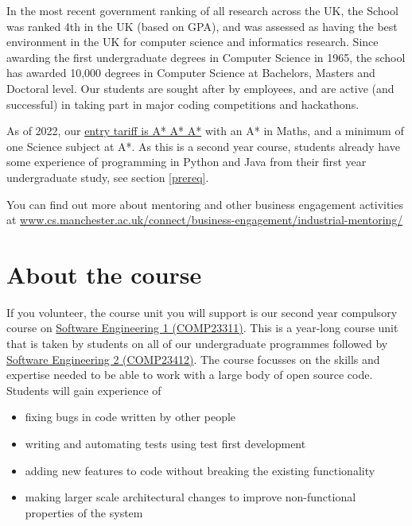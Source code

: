 \documentclass[
]{book}
\providecommand{\tightlist}{%
  \setlength{\itemsep}{0pt}\setlength{\parskip}{0pt}}
\begin{document}
In the most recent government ranking of all research across the UK, the School was ranked 4th in the UK (based on GPA), and was assessed as having the best environment in the UK for computer science and informatics research. Since awarding the first undergraduate degrees in Computer Science in 1965, the school has awarded 10,000 degrees in Computer Science at Bachelors, Masters and Doctoral level. Our students are sought after by employees, and are active (and successful) in taking part in major coding competitions and hackathons.

As of 2022, our \href{https://www.manchester.ac.uk/study/undergraduate/courses/2022/00560/bsc-computer-science/}{entry tariff is A* A* A*} with an A* in Maths, and a minimum of one Science subject at A*. As this is a second year course, students already have some experience of programming in Python and Java from their first year undergraduate study, see section \ref{prereq}.

You can find out more about mentoring and other business engagement activities at \href{https://www.cs.manchester.ac.uk/connect/business-engagement/industrial-mentoring/}{www.cs.manchester.ac.uk/connect/business-engagement/industrial-mentoring/}

\hypertarget{thecourse}{%
\section{About the course}\label{thecourse}}

If you volunteer, the course unit you will support is our second year compulsory course on \href{https://studentnet.cs.manchester.ac.uk/ugt/COMP23311/syllabus/}{Software Engineering 1 (COMP23311)}. This is a year-long course unit that is taken by students on all of our undergraduate programmes followed by \href{https://studentnet.cs.manchester.ac.uk/ugt/COMP23412/syllabus/}{Software Engineering 2 (COMP23412)}. The course focusses on the skills and expertise needed to be able to work with a large body of open source code. Students will gain experience of

\begin{itemize}
\tightlist
\item
  fixing bugs in code written by other people
\item
  writing and automating tests using test first development
\item
  adding new features to code without breaking the existing functionality
\item
  making larger scale architectural changes to improve non-functional properties of the system
\end{itemize}
\end{document}
